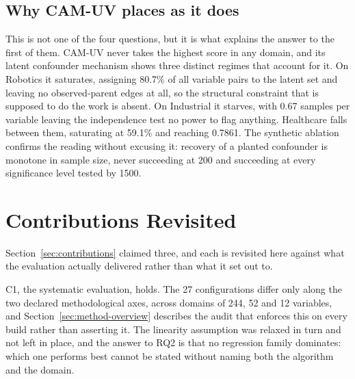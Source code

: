 \subsection*{Why CAM-UV places as it does}
This is not one of the four questions, but it is what explains the answer to the first of them. CAM-UV never takes the highest score in any domain, and its latent confounder mechanism shows three distinct regimes that account for it. On Robotics it saturates, assigning 80.7\% of all variable pairs to the latent set and leaving no observed-parent edges at all, so the structural constraint that is supposed to do the work is absent. On Industrial it starves, with 0.67 samples per variable leaving the independence test no power to flag anything. Healthcare falls between them, saturating at 59.1\% and reaching 0.7861. The synthetic ablation confirms the reading without excusing it: recovery of a planted confounder is monotone in sample size, never succeeding at 200 and succeeding at every significance level tested by 1500.

\section{Contributions Revisited}
\label{sec:conc-contributions}

Section~\ref{sec:contributions} claimed three, and each is revisited here against what the evaluation actually delivered rather than what it set out to.

C1, the systematic evaluation, holds. The 27 configurations differ only along the two
declared methodological axes, across domains of 244, 52 and 12 variables, and Section~\ref{sec:method-overview} describes the audit that enforces this on every build rather than asserting it. The linearity assumption was relaxed in turn and not left in place, and the answer to RQ2 is that no regression family dominates: which one performs best cannot be stated without naming both the algorithm and the domain.

